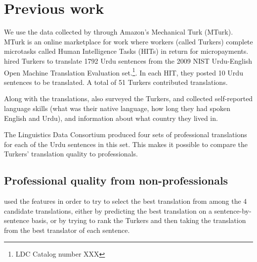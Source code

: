 \documentclass[11pt]{article}
\begin{document}
\section{Previous work}


We use the data collected by   through Amazon's Mechanical Turk (MTurk). MTurk is an online marketplace for work where workers (called Turkers) complete microtasks called Human Intelligence Tasks (HITs) in return for micropayments.   hired Turkers to translate 1792 Urdu sentences 
from the  2009 NIST Urdu-English Open Machine Translation Evaluation set.\footnote{LDC Catalog number XXX}. In each HIT, they posted 10 Urdu sentences to be translated. A total of 51 Turkers contributed translations. 

Along with the translations,  also surveyed the Turkers, and collected self-reported language skills (what was their native language, how long they had spoken English and Urdu), and information about what country they lived in.

The Linguistics Data Consortium produced four sets of professional translations for each  of the Urdu sentences in this set. This makes it possible to compare the Turkers' translation quality to professionals. 

\subsection{Professional quality from non-professionals}

  used the features in order to try to select the best translation from among the 4 candidate translations, either by predicting the best translation on a sentence-by-sentence basis, or by trying to rank the Turkers and then taking the translation from the best translator of each sentence. 
\end{document}
